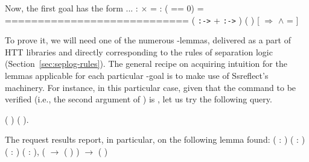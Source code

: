 Now, the first goal has the form 
\coqdoceol
\coqdocemptyline
\coqdocindent{1.00em}
...\coqdoceol
\coqdocindent{1.00em}
 :   \ensuremath{\times}  =  \coqdoceol
\coqdocindent{1.00em}
 : ( == 0) = \coqdoceol
\coqdocindent{1.00em}
============================\coqdoceol
\coqdocindent{1.50em}
 ( \texttt{:->}  +  \texttt{:->} ) ( )\coqdoceol
\coqdocindent{2.50em}
[   \ensuremath{\Rightarrow}      \ensuremath{\land}  =  ]

\coqdocemptyline
To prove it, we will need one of the numerous -lemmas, delivered
as a part of HTT libraries and directly corresponding to the rules of
separation logic (Section~\ref{sec:seplog-rules}). The general
recipe on acquiring intuition for the lemmas applicable for each
particular -goal is to make use of Ssreflect's 
machinery. For instance, in this particular case, given that the
command to be verified (i.e., the second argument of ) is 
, let us try the following query.
\begin{coqdoccode}
\coqdocemptyline
\coqdocnoindent
{} \coqdocvar{\_} ( \coqdocvar{\_} \coqdocvar{\_} \coqdocvar{\_}) ( \coqdocvar{\_}).\coqdoceol
\coqdocemptyline
\end{coqdoccode}
The request results report, in particular, on the following lemma
found:
\coqdoceol
\coqdocemptyline
\coqdocnoindent
{}\coqdoceol
\coqdocindent{1.50em}
\coqdockw{\ensuremath{\forall}} ( : ) ( : ) ( : ) ( :  ),\coqdoceol
\coqdocindent{1.50em}
(  \ensuremath{\rightarrow}  ( ) ) \ensuremath{\rightarrow}   ( ) 

